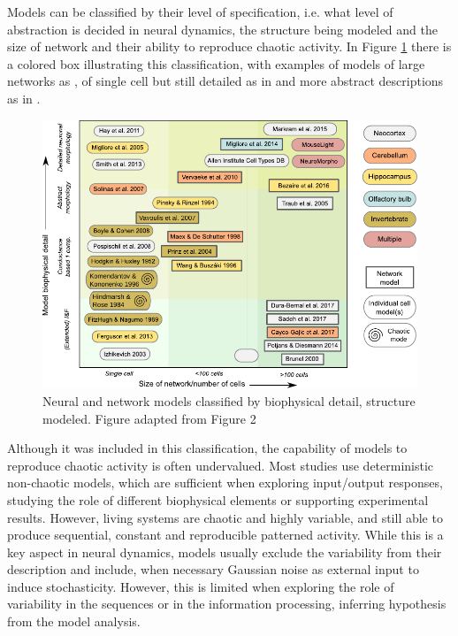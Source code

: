 Models can be classified by their level of specification, i.e. what level of abstraction is decided in neural dynamics, the structure being modeled and the size of network and their ability to reproduce chaotic activity. In Figure \ref{fig:models-classification} there is a colored box illustrating this classification, with examples of models of large networks as \cite{potjans2014,bezaire2016}, of single cell but still detailed as in \cite{smith2013} and more abstract descriptions as in \cite{izhikevich}.


\begin{figure}[bth!]
	\centering
	\includegraphics[width=\textwidth]{img/intro/models classification.pdf}
	\caption{Neural and network models classified by biophysical detail, structure modeled. Figure adapted from Figure 2 \cite{gleeson_open_2019}}
	\label{fig:models-classification}
\end{figure}
Although it was included in this classification, the capability of models to reproduce chaotic activity is often undervalued. Most studies use deterministic non-chaotic models, which are sufficient when exploring input/output responses, studying the role of different biophysical elements or supporting experimental results. However, living systems are chaotic and highly variable, and still able to produce sequential, constant and reproducible patterned activity. While this is a key aspect in neural dynamics, models usually exclude the variability from their description and include, when necessary Gaussian noise as external input to induce stochasticity. However, this is limited when exploring the role of variability in the sequences or in the information processing, inferring hypothesis from the model analysis.

